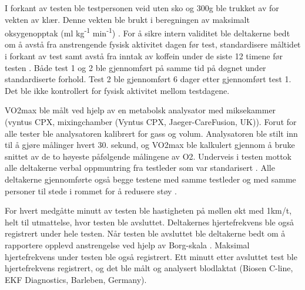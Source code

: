 \documentclass[
]{book}
\begin{document}
I forkant av testen ble testpersonen veid uten sko og 300g ble trukket av for vekten av klær. Denne vekten ble brukt i beregningen av maksimalt oksygenopptak (ml kg\textsuperscript{-1} min\textsuperscript{-1}) . For å sikre intern validitet ble deltakerne bedt om å avstå fra anstrengende fysisk aktivitet dagen før test, standardisere måltidet i forkant av test samt avstå fra inntak av koffein under de siste 12 timene før testen \citep{halperin2015}. Både test 1 og 2 ble gjennomført på samme tid på døgnet under standardiserte forhold. Test 2 ble gjennomført 6 dager etter gjennomført test 1. Det ble ikke kontrollert for fysisk aktivitet mellom testdagene.

VO2max ble målt ved hjelp av en metabolsk analysator med miksekammer (vyntus CPX, mixingchamber (Vyntus CPX, Jaeger-CareFusion, UK)). Forut for alle tester ble analysatoren kalibrert for gass og volum. Analysatoren ble stilt inn til å gjøre målinger hvert 30. sekund, og VO2max ble kalkulert gjennom å bruke snittet av de to høyeste påfølgende målingene av O2. Underveis i testen mottok alle deltakerne verbal oppmuntring fra testleder som var standarisert \citep{halperin2015}. Alle deltakerne gjennomførte også begge testene med samme testleder og med samme personer til stede i rommet for å redusere støy \citep{halperin2015}.

For hvert medgåtte minutt av testen ble hastigheten på møllen økt med 1km/t, helt til utmattelse, hvor testen ble avsluttet. Deltakernes hjertefrekvens ble også registrert under hele testen. Når testen ble avsluttet ble deltakerne bedt om å rapportere opplevd anstrengelse ved hjelp av Borg-skala \citep{borg1982}. Maksimal hjertefrekvens under testen ble også registrert. Ett minutt etter avsluttet test ble hjertefrekvens registrert, og det ble målt og analysert blodlaktat (Biosen C-line, EKF Diagnostics, Barleben, Germany).

\providecommand{\docline}[3]{\noalign{\global\setlength{\arrayrulewidth}{#1}}\arrayrulecolor[HTML]{#2}\cline{#3}}

\setlength{\tabcolsep}{2pt}

\renewcommand*{\arraystretch}{1.5}
\end{document}
